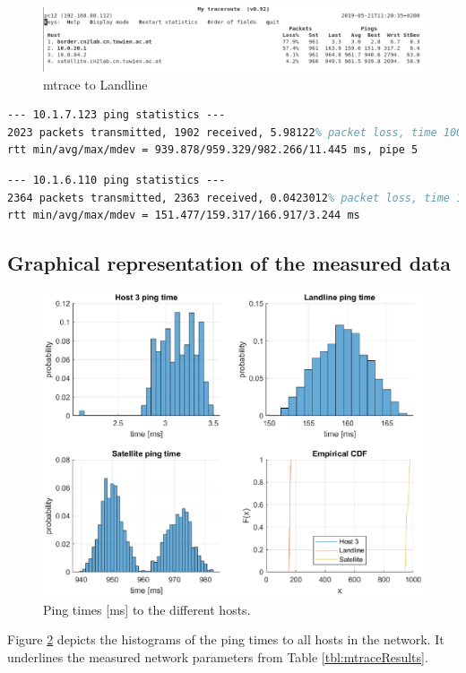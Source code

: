 \documentclass[parskip=full]{scrartcl}
\begin{document}
\begin{figure}[ht]
    \centering
   \includegraphics[width=\textwidth]{images/mytraceroute2.png} 
    \caption{mtrace to Landline}
    \label{fig:mtraceLandline}
\end{figure}


\begin{lstlisting}[language=tex, breaklines, frame=single, caption={Landline Network Parameters}, label=lst:landlineNetwork, float, floatplacement=h]
--- 10.1.7.123 ping statistics ---
2023 packets transmitted, 1902 received, 5.98122% packet loss, time 1004ms
rtt min/avg/max/mdev = 939.878/959.329/982.266/11.445 ms, pipe 5
\end{lstlisting}

\begin{lstlisting}[language=tex, breaklines, frame=single, caption={Landline Network Parameters}, label=lst:landlineNetwork, float, floatplacement=h]
--- 10.1.6.110 ping statistics ---
2364 packets transmitted, 2363 received, 0.0423012% packet loss, time 1105ms
rtt min/avg/max/mdev = 151.477/159.317/166.917/3.244 ms
\end{lstlisting}


\subsection{Graphical representation of the measured data}
\begin{figure}
    \centering
    \includegraphics[width=1\textwidth]{dumps/ping_times.eps} 
    \caption{Ping times [ms] to the different hosts. }
    \label{fig:ping_times}
\end{figure}
Figure \ref{fig:ping_times} depicts the histograms of the ping times to all hosts in the network. 
It underlines the measured network parameters from Table \ref{tbl:mtraceResults}.
\end{document}

